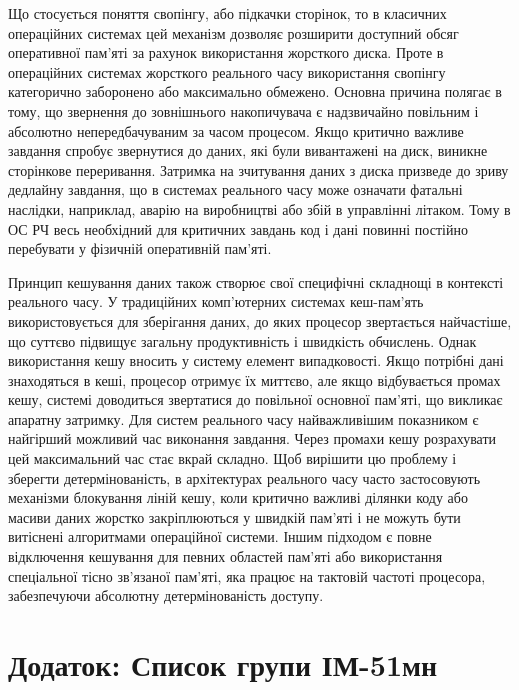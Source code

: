 \documentclass[14pt, a4paper]{extreport}
\begin{document}
	Що стосується поняття свопінгу, або підкачки сторінок, то в класичних операційних системах цей механізм дозволяє розширити доступний обсяг оперативної пам'яті за рахунок використання жорсткого диска. Проте в операційних системах жорсткого реального часу використання свопінгу категорично заборонено або максимально обмежено. Основна причина полягає в тому, що звернення до зовнішнього накопичувача є надзвичайно повільним і абсолютно непередбачуваним за часом процесом. Якщо критично важливе завдання спробує звернутися до даних, які були вивантажені на диск, виникне сторінкове переривання. Затримка на зчитування даних з диска призведе до зриву дедлайну завдання, що в системах реального часу може означати фатальні наслідки, наприклад, аварію на виробництві або збій в управлінні літаком. Тому в ОС РЧ весь необхідний для критичних завдань код і дані повинні постійно перебувати у фізичній оперативній пам'яті. 
	
	Принцип кешування даних також створює свої специфічні складнощі в контексті реального часу. У традиційних комп'ютерних системах кеш-пам'ять використовується для зберігання даних, до яких процесор звертається найчастіше, що суттєво підвищує загальну продуктивність і швидкість обчислень. Однак використання кешу вносить у систему елемент випадковості. Якщо потрібні дані знаходяться в кеші, процесор отримує їх миттєво, але якщо відбувається промах кешу, системі доводиться звертатися до повільної основної пам'яті, що викликає апаратну затримку. Для систем реального часу найважливішим показником є найгірший можливий час виконання завдання. Через промахи кешу розрахувати цей максимальний час стає вкрай складно. Щоб вирішити цю проблему і зберегти детермінованість, в архітектурах реального часу часто застосовують механізми блокування ліній кешу, коли критично важливі ділянки коду або масиви даних жорстко закріплюються у швидкій пам'яті і не можуть бути витіснені алгоритмами операційної системи. Іншим підходом є повне відключення кешування для певних областей пам'яті або використання спеціальної тісно зв'язаної пам'яті, яка працює на тактовій частоті процесора, забезпечуючи абсолютну детермінованість доступу.
	
	\pagebreak
	
	\section*{Додаток: Список групи ІМ-51мн} 
	
\end{document}
